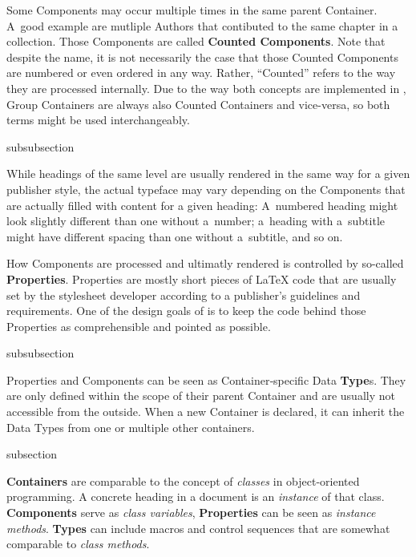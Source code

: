 Some Components may occur multiple times in the same parent
Container. A~good example are mutliple Authors that contibuted to the
same chapter in a collection. Those Components are called
\textbf{Counted Components}. Note that
despite the name, it is not necessarily the case that those Counted
Components are numbered or even ordered in any way. Rather,
``Counted'' refers to the way they are processed internally. Due to
the way both concepts are implemented in {\CoCoTeX}, Group Containers
are always also Counted Containers and vice-versa, so both terms might
be used interchangeably.

\begin{Heading}[label=sec:overview.properties]{subsubsection}
\end{Heading}

While headings of the same level are usually rendered in the same way
for a given publisher style, the actual typeface may vary depending on
the Components that are actually filled with content for a given
heading: A~numbered heading might look slightly different than one
without a~number; a~heading with a~subtitle might have different
spacing than one without a~subtitle, and so on.

How Components are processed and ultimatly rendered is controlled by
so-called \textbf{Properties}. Properties are
mostly short pieces of {\LaTeX} code that are usually set by the
stylesheet developer according to a publisher's guidelines and
requirements. One of the design goals of {\CoCoTeX} is to keep the
code behind those Properties as comprehensible and pointed as
possible.

\begin{Heading}[label=sec:overview.types]{subsubsection}
\end{Heading}

Properties and Components can be seen as Container‐specific Data
\textbf{Type}s. They are only defined within the
scope of their parent Container and are usually not accessible from
the outside. When a new Container is declared, it can inherit the Data
Types from one or multiple other containers.

\begin{Heading}[label=sec:oop]{subsection}
\end{Heading}


\textbf{Containers} are comparable to the concept of \textit{classes}
in object-oriented programming. A concrete heading in a document is an
\textit{instance} of that class. \textbf{Components} serve as
\textit{class variables}, \textbf{Properties} can be seen as
\textit{instance methods}. \textbf{Types} can include macros and
control sequences that are somewhat comparable to \textit{class
  methods}.

